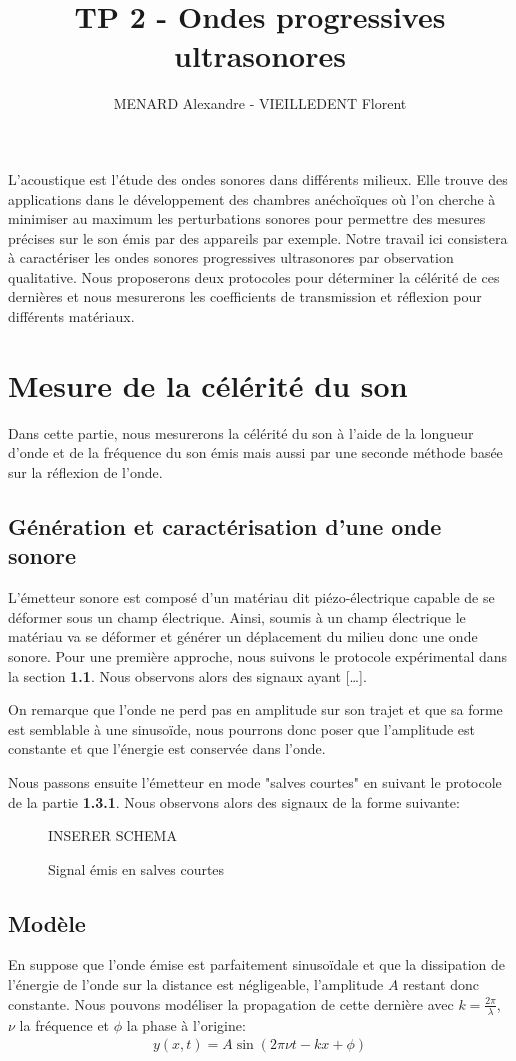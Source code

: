 \documentclass[12pt]{article}
\title{\vspace{-2cm}\textbf{TP 2 - Ondes progressives ultrasonores}}
\author{MENARD Alexandre - VIEILLEDENT Florent}
\date{\vspace{-0.5cm}}
\begin{document}
\maketitle

L'acoustique est l'étude des ondes sonores dans différents milieux. Elle trouve des applications dans le développement des chambres
anéchoïques où l'on cherche à minimiser au maximum les perturbations sonores pour permettre des mesures précises sur le son émis par des appareils par exemple. 
Notre travail ici consistera à caractériser les ondes sonores progressives ultrasonores par observation qualitative. Nous proposerons
deux protocoles pour déterminer la célérité de ces dernières et nous mesurerons les coefficients de transmission et réflexion pour différents matériaux.

\section{Mesure de la célérité du son}
Dans cette partie, nous mesurerons la célérité du son à l'aide de la longueur d'onde et de la fréquence du son émis mais aussi par une seconde méthode basée sur la réflexion de l'onde.

\subsection{Génération et caractérisation d'une onde sonore}
L'émetteur sonore est composé d'un matériau dit piézo-électrique capable de se déformer sous un champ électrique. Ainsi, soumis à un champ électrique
le matériau va se déformer et générer un déplacement du milieu donc une onde sonore. Pour une première approche, nous suivons le protocole
expérimental dans la section \textbf{1.1}. Nous observons alors des signaux ayant [\dots].

On remarque que l'onde ne perd pas en amplitude sur son trajet et que sa forme est semblable à une sinusoïde, nous pourrons donc poser que l'amplitude est constante et que l'énergie est conservée dans l'onde.

Nous passons ensuite l'émetteur en mode "salves courtes" en suivant le protocole de la partie \textbf{1.3.1}. Nous observons alors des signaux de la forme suivante:
\begin{figure}[!htbp]
	\centering
	INSERER SCHEMA
	\hfill
	\caption{Signal émis en salves courtes}
\end{figure}

\subsection{Modèle}
En suppose que l'onde émise est parfaitement sinusoïdale et que la dissipation de l'énergie de l'onde sur la distance est négligeable, l'amplitude $A$ restant donc constante. 
Nous pouvons modéliser la propagation de cette dernière avec $k=\frac{2\pi}{\lambda}$, $\nu$ la fréquence et $\phi$ la phase à l'origine:
\begin{align}
	y(x, t) = A \sin(2\pi\nu t - kx + \phi)
\end{align}
\end{document}
